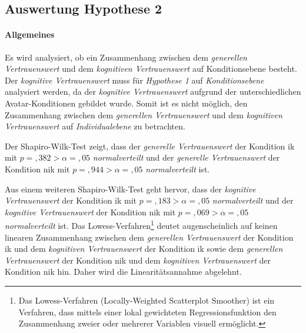 \documentclass[a4paper,11pt]{article}%
\renewcommand{\\}{\vspace*{0.5\baselineskip} \newline}
\begin{document}
{{{{{{\newpage
\subsection{Auswertung Hypothese 2}
\label{Auswertung Hypothese 2}

\paragraph{Allgemeines}
Es wird analysiert, ob ein Zusammenhang zwischen dem \textit{generellen Vertrauenswert} und dem \textit{kognitiven Vertrauenswert} auf Konditionsebene besteht.\\
Der \textit{kognitive Vertrauenswert} muss für \textit{Hypothese 1} auf \textit{Konditionsebene} analysiert werden, da der \textit{kognitive Vertrauenswert} aufgrund der unterschiedlichen Avatar-Konditionen gebildet wurde. Somit ist es nicht möglich, den Zusammenhang zwischen dem \textit{generellen Vertrauenswert} und dem \textit{kognitiven Vertrauenswert} auf \textit{Individualebene} zu betrachten.

Der Shapiro-Wilk-Test zeigt, dass der \textit{generelle Vertrauenswert} der Kondition \ac{ik} mit $p =,382 > \alpha =,05$ \textit{normalverteilt} und der \textit{generelle Vertrauenswert} der Kondition \newline \ac{nik} mit $p =,944 > \alpha =,05$ \textit{normalverteilt} ist.

Aus einem weiteren Shapiro-Wilk-Test geht hervor, dass der \textit{kognitive Vertrauenswert} der Kondition \ac{ik} mit  $p =,183 > \alpha = ,05$ \textit{normalverteilt} und der \textit{kognitive Vertrauenswert} der Kondition \ac{nik} mit $p =,069 > \alpha =,05$ \textit{normalverteilt} ist.
Das Lowess-Verfahren\footnote{Das Lowess-Verfahren (Locally-Weighted Scatterplot Smoother) ist ein Verfahren, dass mittels einer lokal gewichteten Regressionsfunktion den Zusammenhang zweier oder mehrerer Variablen visuell ermöglicht.} deutet augenscheinlich auf keinen linearen Zusammenhang zwischen dem \textit{generellen Vertrauenswert} der Kondition \ac{ik} und dem \textit{kognitiven Vertrauenswert} der Kondition \ac{ik} sowie dem \textit{generellen Vertrauenswert} der Kondition \ac{nik} und dem \textit{kognitiven Vertrauenswert} der Kondition \ac{nik} hin. Daher wird die Linearitätsannahme abgelehnt.

}}}}}}
\end{document}
